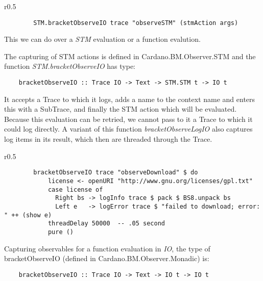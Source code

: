\begin{wrapfigure}{r}{0.5\textwidth}
    \begin{center}\begin{scriptsize}\begin{verbatim}
        STM.bracketObserveIO trace "observeSTM" (stmAction args)
    \end{verbatim}\end{scriptsize}\end{center}
\end{wrapfigure}
  
This we can do over a \emph{STM} evaluation or a function evalution.

The capturing of STM actions is defined in Cardano.BM.Observer.STM and the
function \emph{STM.bracketObserveIO} has type:
\begin{verbatim}
    bracketObserveIO :: Trace IO -> Text -> STM.STM t -> IO t
\end{verbatim}
It accepts a Trace to which it logs, adds a name to the context name and enters
this with a SubTrace, and finally the STM action which will be evaluated.
Because this evaluation can be retried, we cannot pass to it a Trace to which it
could log directly. A variant of this function \mbox{\emph{bracketObserveLogIO}} also
captures log items in its result, which then are threaded through the Trace.
\\
\begin{wrapfigure}{r}{0.5\textwidth}
    \begin{center}\begin{scriptsize}\begin{verbatim}
        bracketObserveIO trace "observeDownload" $ do
            license <- openURI "http://www.gnu.org/licenses/gpl.txt"
            case license of
              Right bs -> logInfo trace $ pack $ BS8.unpack bs
              Left e   -> logError trace $ "failed to download; error: " ++ (show e)
            threadDelay 50000  -- .05 second
            pure ()
    \end{verbatim}\end{scriptsize}\end{center}
  \end{wrapfigure}

Capturing observables for a function evaluation in \emph{IO}, the type of
\mbox{bracketObserveIO} (defined in Cardano.BM.Observer.Monadic) is:
\begin{verbatim}
    bracketObserveIO :: Trace IO -> Text -> IO t -> IO t
\end{verbatim}

